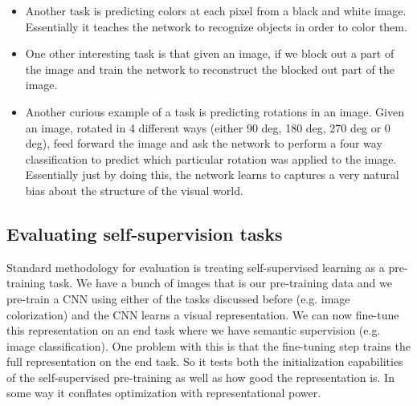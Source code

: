 \begin{itemize}
\item Another task is predicting colors at each pixel from a black and white image. Essentially it teaches the network to recognize objects in order to color them. 

\item One other interesting task is that given an image, if we block out a part of the image and train the network to reconstruct the blocked out part of the image. 

\item Another curious example of a task is predicting rotations in an image. Given an image, rotated in 4 different ways (either 90 deg, 180 deg, 270 deg or 0 deg), feed forward the image and ask the network to perform a four way classification to predict which particular rotation was applied to the image. Essentially just by doing this, the network learns to captures a very natural bias about the structure of the visual world.
\end{itemize}{}

\subsection{Evaluating self-supervision tasks}
Standard methodology for evaluation is treating self-supervised learning as a pre-training task. We have a bunch of images that is our pre-training data and we pre-train a CNN using either of the tasks discussed before (e.g. image colorization) and the CNN learns a visual representation. We can now fine-tune this representation on an end task where we have semantic supervision (e.g. image classification). One problem with this is that the fine-tuning step trains the full representation on the end task. So it tests both the initialization capabilities of the self-supervised pre-training as well as how good the representation is. In some way it conflates optimization with representational power.


